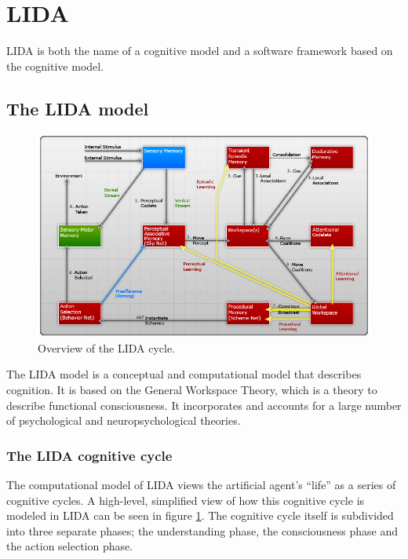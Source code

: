 
\section{LIDA}
\label{sec:lida}
LIDA is both the name of a cognitive model and a software framework based on the cognitive model.

\subsection{The LIDA model}
\begin{figure}[h!tb]
\centering
\includegraphics[width=\textwidth]{graphics/lida-model.png}
\caption{Overview of the LIDA cycle.\cite{franklin2007lida}}
\label{fig:lida-cycle}
\end{figure}

The LIDA model is a conceptual and computational model that describes cognition. It is based on the General Workspace Theory, which is a theory to describe functional consciousness. It incorporates and accounts for a large number of psychological and neuropsychological theories.\cite{Franklin2012}

\subsubsection{The LIDA cognitive cycle}
The computational model of LIDA views the artificial agent's ``life'' as a series of cognitive cycles. A high-level, simplified view of how this cognitive cycle is modeled in LIDA can be seen in figure \ref{fig:lida-cycle}. The cognitive cycle itself is subdivided into three separate phases; the understanding phase, the consciousness phase and the action selection phase.


